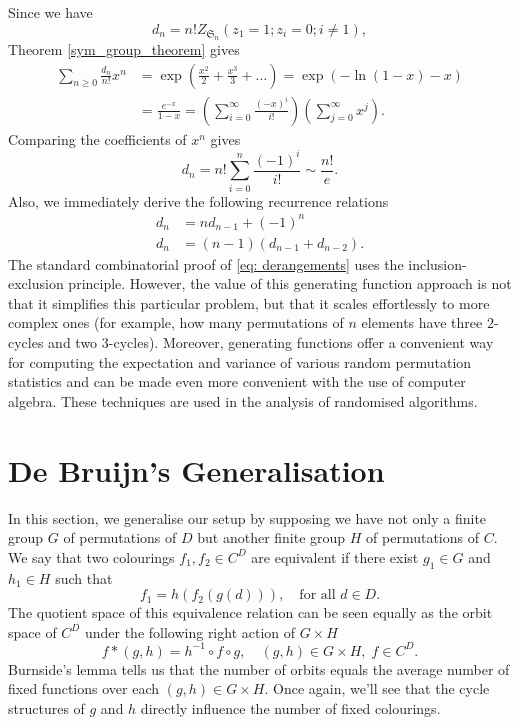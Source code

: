 \documentclass[a4paper,11pt]{article}
\numberwithin{equation}{section}
\begin{document}
    Since we have $$d_n = n! Z_{\mathfrak{S}_n}(z_1 = 1; z_i = 0; i\neq 1),$$ Theorem \ref{sym_group_theorem} gives 
    \begin{align*}
    \sum_{n\geq 0}  \frac{d_n}{n!}x^n &= \exp \left(\frac{x^{2}}{2}  + \frac{x^{3}}{3} +\dots \right)  = \exp(-\ln(1-x)-x) \\
    &= \frac{e^{-x}}{1-x} = \left( \sum_{i = 0}^{\infty} \frac{(-x)^i}{i!} \right)  \left( \sum_{j = 0}^{\infty} x^{j} \right).
    \end{align*}
    Comparing the coefficients of $x^n$ gives
    \begin{equation}
        d_n = n! \sum_{i = 0}^{n}  \frac{(-1)^i}{i!}\sim \frac{n!}{e}. \label{eq: derangements}
    \end{equation}
    Also, we immediately derive the following recurrence relations
    \begin{align*}
        d_n &= nd_{n-1} + (-1)^n \\
        d_n &= (n-1)(d_{n-1}+d_{n-2}).
    \end{align*} The standard combinatorial proof of \eqref{eq: derangements} uses the inclusion-exclusion principle. However, the value of this generating function approach is not that it simplifies this particular problem, but that it scales effortlessly to more complex ones (for example, how many permutations of $n$ elements have three $2$-cycles and two $3$-cycles). Moreover, generating functions offer a convenient way for computing the expectation and variance of various random permutation statistics and can be made even more convenient with the use of computer algebra. These techniques are used in the analysis of randomised algorithms.  \smallskip

    \section{De Bruijn's Generalisation}

    In this section, we generalise our setup by supposing we have not only a finite group $G$ of permutations of $D$ but another finite group $H$ of permutations of $C$. We say that two colourings $f_1, f_2 \in C^D$ are equivalent if there exist $g_1 \in G$ and $h_1 \in H$ such that 
    \begin{equation*}
        f_1 =  h(f_2(g(d))), \quad \text{for all }d\in D.
    \end{equation*}
    The quotient space of this equivalence relation can be seen equally as the orbit space of $C^D$ under the following right action of $G \times H$ \begin{equation*}
        f*(g,h) = h^{-1} \circ f \circ g, \quad (g,h)\in G\times H, \; f\in C^D.
    \end{equation*}
    Burnside's lemma tells us that the number of orbits equals the average number of fixed functions over each $(g,h) \in G\times H$. Once again, we'll see that the cycle structures of $g$ and $h$ directly influence the number of fixed colourings. 
\end{document}
